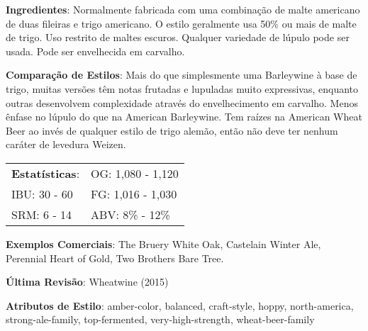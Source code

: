 \textbf{Ingredientes}: Normalmente fabricada com uma combinação de malte americano de duas fileiras e trigo americano. O estilo geralmente usa 50\% ou mais de malte de trigo. Uso restrito de maltes escuros. Qualquer variedade de lúpulo pode ser usada. Pode ser envelhecida em carvalho.

\textbf{Comparação de Estilos}: Mais do que simplesmente uma Barleywine à base de trigo, muitas versões têm notas frutadas e lupuladas muito expressivas, enquanto outras desenvolvem complexidade através do envelhecimento em carvalho. Menos ênfase no lúpulo do que na American Barleywine. Tem raízes na American Wheat Beer ao invés de qualquer estilo de trigo alemão, então não deve ter nenhum caráter de levedura Weizen.

\begin{tabular}{@{}p{35mm}p{35mm}@{}}
  \textbf{Estatísticas}: & OG: 1,080 - 1,120 \\
  IBU: 30 - 60 & FG: 1,016 - 1,030 \\
  SRM: 6 - 14 & ABV: 8\% - 12\%
\end{tabular}

\textbf{Exemplos Comerciais}: The Bruery White Oak, Castelain Winter Ale, Perennial Heart of Gold, Two Brothers Bare Tree.

\textbf{Última Revisão}: Wheatwine (2015)

\textbf{Atributos de Estilo}: amber-color, balanced, craft-style, hoppy, north-america, strong-ale-family, top-fermented, very-high-strength, wheat-beer-family
